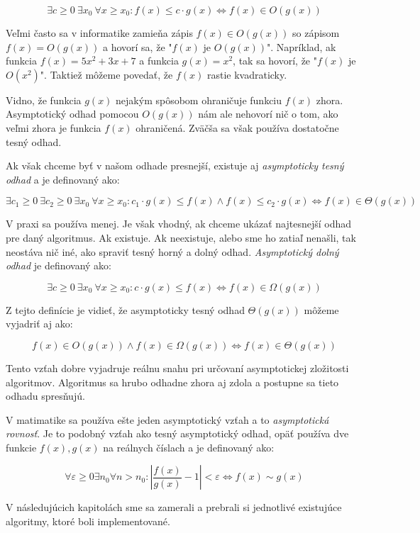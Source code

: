$$\exists c\ge 0\ \exists x_0\ \forall x\ge x_0: 
f(x) \leq c\cdot g(x) \iff f(x) \in O(g(x))$$

Veľmi často sa v informatike zamieňa zápis $f(x) \in O(g(x))$ so zápisom 
$f(x) = O(g(x))$ a hovorí sa, že "$f(x)$ je $O(g(x))$". Napríklad, ak 
funkcia $f(x) = 5x^2+3x+7$ a funkcia $g(x) = x^2$, tak sa hovorí, 
že "$f(x)$ je $O(x^2)$". Taktiež môžeme povedať, že $f(x)$ rastie 
kvadraticky.

Vidno, že funkcia $g(x)$ nejakým spôsobom ohraničuje funkciu $f(x)$ zhora. 
Asymptotický odhad pomocou $O(g(x))$ nám ale nehovorí nič o tom, ako veľmi 
zhora je funkcia $f(x)$ ohraničená. Zväčša sa však používa dostatočne tesný 
odhad.

Ak však chceme byť v našom odhade presnejší, existuje aj \emph{asymptoticky tesný 
odhad} a je definovaný ako:

$$\exists c_1\ge 0\ \exists c_2\ge 0\ \exists x_0\ \forall x\ge x_0: 
c_1\cdot g(x)\leq f(x) \wedge f(x) \leq c_2\cdot g(x) \iff f(x) \in \Theta (g(x))$$

V praxi sa používa menej. Je však vhodný, ak chceme ukázať najtesnejší odhad 
pre daný algoritmus. Ak existuje. Ak neexistuje, alebo sme ho zatiaľ nenašli, 
tak neostáva nič iné, ako spraviť tesný horný a dolný odhad. 
\emph{Asymptotický dolný odhad} je 
definovaný ako:

$$\exists c\ge 0\ \exists x_0\ \forall x\ge x_0: 
c\cdot g(x) \leq f(x) \iff f(x) \in \Omega (g(x))$$

Z tejto definície je vidieť, že asymptoticky tesný odhad $\Theta (g(x))$ môžeme 
vyjadriť aj ako: 

$$f(x) \in O(g(x)) \wedge f(x) \in \Omega (g(x)) \iff f(x) \in \Theta (g(x))$$

Tento vzťah dobre vyjadruje reálnu snahu pri určovaní asymptotickej zložitosti 
algoritmov. Algoritmus sa hrubo odhadne zhora aj zdola a postupne sa tieto 
odhadu spresňujú. 

V matimatike sa používa ešte jeden asymptotický vzťah a to 
\emph{asymptotická rovnosť}. Je to podobný vzťah ako tesný asymptotický odhad, 
opäť používa dve funkcie $f(x), g(x)$ na reálnych číslach a je definovaný ako:

$$\forall \varepsilon \ge 0 \exists n_0 \forall n > n_0: 
\left| \frac{f(x)}{g(x)} - 1 \right| < \varepsilon \iff f(x) \sim g(x)$$

V následujúcich kapitolách sme sa zamerali a prebrali si jednotlivé existujúce 
algoritmy, ktoré boli implementované.
